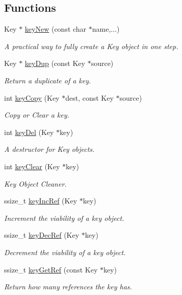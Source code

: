 \subsection*{Functions}
\begin{DoxyCompactItemize}
\item 
Key $\ast$ \hyperlink{group__key_gad23c65b44bf48d773759e1f9a4d43b89}{key\-New} (const char $\ast$name,...)
\begin{DoxyCompactList}\small\item\em A practical way to fully create a Key object in one step. \end{DoxyCompactList}\item 
Key $\ast$ \hyperlink{group__key_gae6ec6a60cc4b8c1463fa08623d056ce3}{key\-Dup} (const Key $\ast$source)
\begin{DoxyCompactList}\small\item\em Return a duplicate of a key. \end{DoxyCompactList}\item 
int \hyperlink{group__key_ga6a12cbbe656a1ad9f41b8c681d7a2f92}{key\-Copy} (Key $\ast$dest, const Key $\ast$source)
\begin{DoxyCompactList}\small\item\em Copy or Clear a key. \end{DoxyCompactList}\item 
int \hyperlink{group__key_ga3df95bbc2494e3e6703ece5639be5bb1}{key\-Del} (Key $\ast$key)
\begin{DoxyCompactList}\small\item\em A destructor for Key objects. \end{DoxyCompactList}\item 
int \hyperlink{group__key_gab2242311a36bbc0520e0d36895107ec1}{key\-Clear} (Key $\ast$key)
\begin{DoxyCompactList}\small\item\em Key Object Cleaner. \end{DoxyCompactList}\item 
ssize\-\_\-t \hyperlink{group__key_ga6970a6f254d67af7e39f8e469bb162f1}{key\-Inc\-Ref} (Key $\ast$key)
\begin{DoxyCompactList}\small\item\em Increment the viability of a key object. \end{DoxyCompactList}\item 
ssize\-\_\-t \hyperlink{group__key_ga2c6433ca22109e4e141946057eccb283}{key\-Dec\-Ref} (Key $\ast$key)
\begin{DoxyCompactList}\small\item\em Decrement the viability of a key object. \end{DoxyCompactList}\item 
ssize\-\_\-t \hyperlink{group__key_ga4aabc4272506dd63161db2bbb42de8ae}{key\-Get\-Ref} (const Key $\ast$key)
\begin{DoxyCompactList}\small\item\em Return how many references the key has. \end{DoxyCompactList}\end{DoxyCompactItemize}


